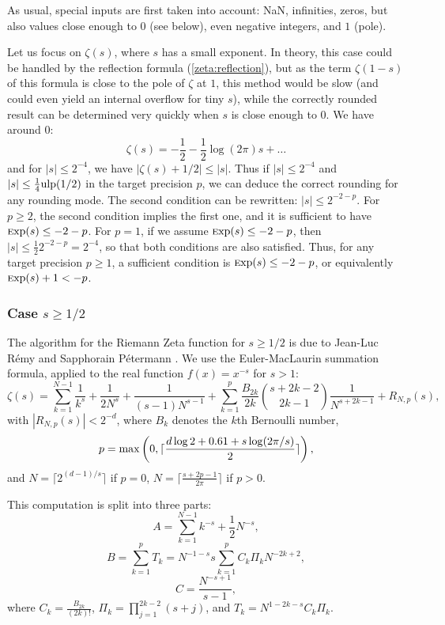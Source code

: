 \documentclass[12pt]{amsart}
\def\ulp{{\rm ulp}}
\def\Exp{{\rm \textsc exp}}
\begin{document}
As usual, special inputs are first taken into account: NaN, infinities,
zeros, but also values close enough to $0$ (see below), even negative
integers, and $1$ (pole).

Let us focus on $\zeta(s)$, where $s$ has a small exponent.
In theory, this case could be handled by the reflection formula
(\textsection\ref{zeta:reflection}), but as the term $\zeta(1-s)$
of this formula is close to the pole of $\zeta$ at $1$, this method would
be slow (and could even yield an internal overflow for tiny $s$), while
the correctly rounded result can be determined very quickly when $s$ is
close enough to $0$. We have around $0$:
\[ \zeta(s) = -\frac{1}{2} - \frac{1}{2} \log(2 \pi) s + \ldots \]
and for $|s| \leq 2^{-4}$, we have $|\zeta(s) + 1/2| \leq |s|$. Thus
if $|s| \leq 2^{-4}$ and $|s| \leq \frac{1}{4} \ulp(1/2)$ in the target
precision $p$, we can deduce the correct rounding for any rounding mode.
The second condition can be rewritten: $|s| \leq 2^{-2-p}$. For $p \geq 2$,
the second condition implies the first one, and it is sufficient to have
$\Exp(s) \leq -2-p$. For $p = 1$, if we assume $\Exp(s) \leq -2-p$, then
$|s| \leq \frac{1}{2} 2^{-2-p} = 2^{-4}$, so that both conditions are
also satisfied. Thus, for any target precision $p \geq 1$, a sufficient
condition is $\Exp(s) \leq -2-p$, or equivalently $\Exp(s) + 1 < -p$.

\subsubsection{Case $s \geq 1/2$}

The algorithm for the Riemann Zeta function for $s \geq 1/2$ is due to
Jean-Luc R\'emy and Sapphorain P\'etermann \cite{PeRe06,PeRe07}.
We use the Euler-MacLaurin summation formula, applied
to the real function $f(x) = x^{-s}$ for $s > 1$:
\[ \zeta(s) = \sum_{k=1}^{N-1} \frac{1}{k^s} + \frac{1}{2N^s}
+ \frac{1}{(s-1)N^{s-1}} + \sum_{k=1}^p \frac{B_{2k}}{2k}
{s+2k-2 \choose 2k-1} \frac{1}{N^{s+2k-1}} + R_{N,p}(s), \]
with $|R_{N,p}(s)| < 2^{-d}$, where $B_k$ denotes the $k$th Bernoulli
number,
\[ p = {\rm max}\left( 0, \lceil \frac{d \log 2 + 0.61 + s \log(2\pi/s)}{2}
\rceil \right), \]
and $N = \lceil 2^{(d-1)/s} \rceil$ if $p=0$,
$N = \lceil \frac{s+2p-1}{2\pi} \rceil$ if $p > 0$.

This computation is split into three parts:
\[ A = \sum_{k=1}^{N-1} k^{-s} + \frac{1}{2} N^{-s}, \]
\[ B = \sum_{k=1}^p T_k = N^{-1-s} s \sum_{k=1}^p C_k \Pi_k N^{-2k+2}, \]
\[ C = \frac{N^{-s+1}}{s-1}, \]
where $C_k = \frac{B_{2k}}{(2k)!}$, $\Pi_k = \prod_{j=1}^{2k-2} (s+j)$,
and $T_k = N^{1-2k-s} C_k \Pi_k$.
\end{document}

